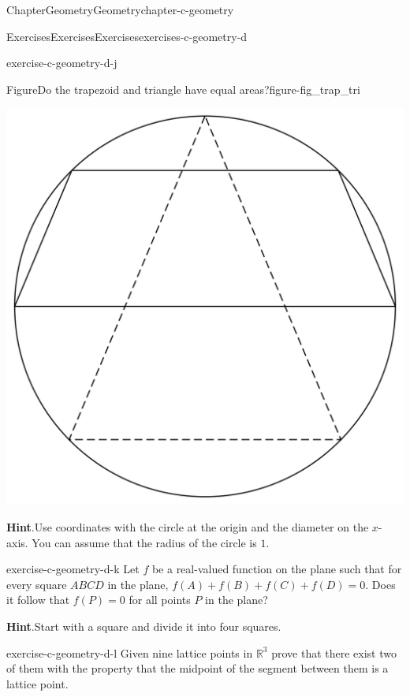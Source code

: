\documentclass[oneside,10pt,]{book}
\newcommand{\blocktitlefont}{\relax}
\numberwithin{equation}{section}
\begin{document}
\begin{chapterptx}{Chapter}{Geometry}{}{Geometry}{}{}{chapter-c-geometry}
\begin{exercises-section}{Exercises}{Exercises}{}{Exercises}{}{}{exercises-c-geometry-d}
\begin{divisionexercise}{9}{}{}{exercise-c-geometry-d-j}
\begin{figureptx}{Figure}{Do the trapezoid and triangle have equal areas?}{figure-fig_trap_tri}{}
\begin{image}{0.2}{0.6}{0.2}{}
\includegraphics[width=\linewidth]{images/fig_trap_tri.png}
\end{image}%
\tcblower
\end{figureptx}%
\par\smallskip%
\noindent\textbf{\blocktitlefont Hint}.\hypertarget{hint-c-geometry-d-j-b}{}\quad{}Use coordinates with the circle at the origin and the diameter on the \(x\)-axis.  You can assume that the radius of the circle is \(1\).%
\end{divisionexercise}%
\begin{divisionexercise}{10}{}{}{exercise-c-geometry-d-k}%
Let \(f\) be a real-valued function on the plane such that for every square \(ABCD\) in the plane, \(f(A) + f(B) + f(C) + f(D) = 0\). Does it follow that \(f(P) = 0\) for all points \(P\) in the plane?%
\par\smallskip%
\noindent\textbf{\blocktitlefont Hint}.\hypertarget{hint-c-geometry-d-k-b}{}\quad{}Start with a square and divide it into four squares.%
\end{divisionexercise}%
\begin{divisionexercise}{11}{}{}{exercise-c-geometry-d-l}%
Given nine lattice points in \(\mathbb{R}^3\) prove that there exist two of them with the property that the midpoint of the segment between them is a lattice point.%
\end{divisionexercise}%

\end{exercises-section}
\end{chapterptx}
\end{document}
